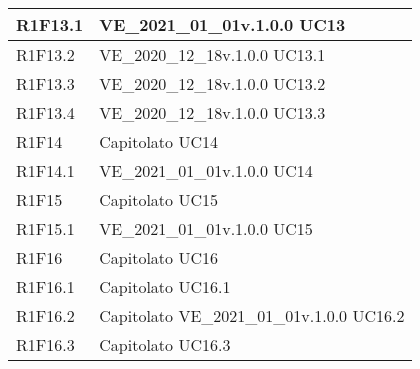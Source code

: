 \begin{center}
\begin{longtable}{|p{22mm}|p{44mm}|}
R1F13.1 &
VE\_2021\_01\_01v.1.0.0 \newline
UC13 \newline
\\
\hline

R1F13.2 &
VE\_2020\_12\_18v.1.0.0 \newline
UC13.1 \newline
\\
\hline

R1F13.3 &
VE\_2020\_12\_18v.1.0.0 \newline
UC13.2 \newline
\\
\hline

R1F13.4 &
VE\_2020\_12\_18v.1.0.0 \newline
UC13.3 \newline
\\
\hline

R1F14 &
Capitolato \newline
UC14 \newline
\\
\hline

R1F14.1 &
VE\_2021\_01\_01v.1.0.0 \newline
UC14 \newline
\\
\hline

R1F15 &
Capitolato \newline
UC15 \newline
\\
\hline

R1F15.1 &
VE\_2021\_01\_01v.1.0.0 \newline
UC15 \newline
\\
\hline

R1F16 &
Capitolato \newline
UC16 \newline
\\
\hline

R1F16.1 &
Capitolato \newline
UC16.1 \newline
\\
\hline

R1F16.2 &
Capitolato \newline
VE\_2021\_01\_01v.1.0.0 \newline
UC16.2 \newline
\\
\hline

R1F16.3 &
Capitolato \newline
UC16.3 \newline
\\
\hline


\end{longtable}
\end{center}
